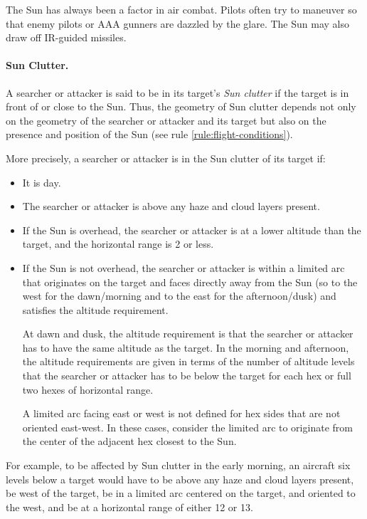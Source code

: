 \begin{advancedrules}
{The Sun has always been a factor in air combat. Pilots often try to maneuver so that enemy pilots or AAA gunners are dazzled by the glare. The Sun may also draw off IR-guided missiles.

\paragraph{Sun Clutter.} 
A searcher or attacker is said to be in its target's \emph{Sun clutter} if the target is in front of or close to the Sun. Thus, the geometry of Sun clutter depends not only on the geometry of the searcher or attacker and its target but also on the presence and position of the Sun (see rule \ref{rule:flight-conditions}).

More precisely, a searcher or attacker is in the Sun clutter of its target if:

\begin{itemize}
\item It is day.
\item The searcher or attacker is above any haze and cloud layers present.
\item If the Sun is overhead, the searcher or attacker is at a lower altitude than the target, and the horizontal range is 2 or less.
\item If the Sun is not overhead, the searcher or attacker is within a limited arc that originates on the target and faces directly away from the Sun (so to the west for the dawn/morning and to the east for the afternoon/dusk) and satisfies the altitude requirement. 

At dawn and dusk, the altitude requirement is that the searcher or attacker has to have the same altitude as the target. In the morning and afternoon, the altitude requirements are given in terms of the number of altitude levels that the searcher or attacker has to be below the target for each hex or full two hexes of horizontal range.

A limited arc facing east or west is not defined for hex sides that are not oriented east-west. In these cases, consider the limited arc to originate from the center of the adjacent hex closest to the Sun.

\end{itemize}

For example, to be affected by Sun clutter in the early morning, an aircraft six levels below a target would have to be above any haze and cloud layers present, be west of the target, be in a limited arc centered on the target, and oriented to the west, and be at a horizontal range of either 12 or 13.

}
\end{advancedrules}
